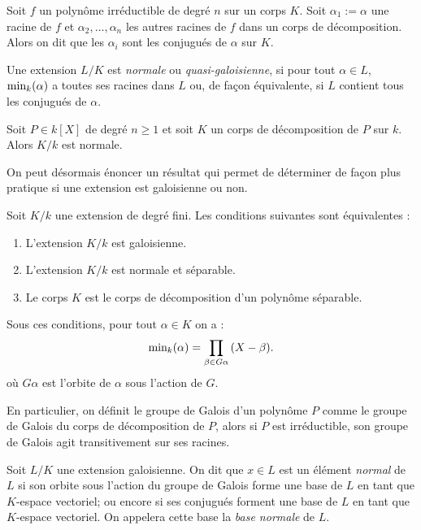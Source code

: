 \documentclass[a4paper]{article} %
\numberwithin{section}{part}
\numberwithin{equation}{section}
\newcommand\Irr[2]{\textup{min}_{#1}(#2)}
\begin{document}
Soit $f$ un polynôme irréductible de degré $n$ sur un corps $K$. Soit $\alpha_1 
:= \alpha$ une racine de $f$ et $\alpha_2,\dots,\alpha_n$ les autres racines de 
$f$ dans un corps de décomposition. Alors on dit que les $\alpha_i$ sont les 
conjugués de $\alpha$ sur $K$.
\begin{defn}
Une extension $L/K$ est \emph{normale} ou \emph{quasi-galoisienne}, si pour tout
$\alpha\in L$, $\Irr{k}{\alpha}$ a toutes ses racines dans $L$ ou, de façon 
équivalente, si $L$ contient tous les conjugués de $\alpha$.
\end{defn}

\begin{prop}
\label{prop:decompnorm}
Soit $P\in k[X]$ de degré $n\geq 1$ et soit $K$ un corps de décomposition de $P$
sur $k$. Alors $K/k$ est normale.
\end{prop}

On peut désormais énoncer un résultat qui permet de déterminer de façon plus
pratique si une extension est galoisienne ou non.

\begin{thm}
Soit $K/k$ une extension de degré fini. Les conditions suivantes sont
équivalentes :
\begin{enumerate}
\item L'extension $K/k$ est galoisienne.
\item L'extension $K/k$ est normale et séparable.
\item Le corps $K$ est le corps de décomposition d'un polynôme séparable.
\end{enumerate}
Sous ces conditions, pour tout $\alpha\in K$ on a :
\begin{equation}
\Irr{k}{\alpha} = \prod_{\beta\in G\alpha}{(X - \beta)}.
\end{equation}
où $G\alpha$ est l'orbite de $\alpha$ sous l'action de $G$.
\end{thm}

\begin{rem}
En particulier, on définit le groupe de Galois d'un polynôme $P$ comme le
groupe de Galois du corps de décomposition de $P$, alors si $P$ est
irréductible, son groupe de Galois agit transitivement sur ses racines.
\end{rem}

\begin{defn}
\label{def:elemnorm}
Soit $L/K$ une extension galoisienne. On dit que $x\in L$ est un élément
\emph{normal} de $L$ si son orbite sous l'action du groupe de Galois forme une 
base de $L$ en tant que $K$-espace vectoriel; ou encore si ses conjugués forment
une base de $L$ en tant que $K$-espace vectoriel. On appelera cette base la 
\emph{base normale} de $L$.
\end{defn}
\end{document}
